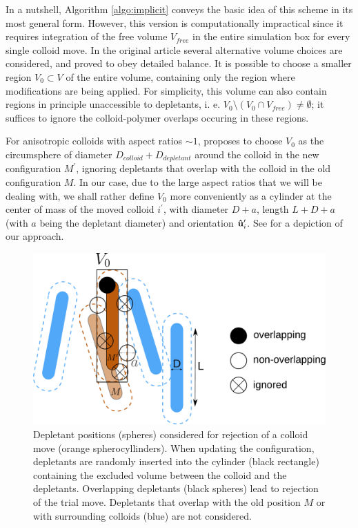 In a nutshell, Algorithm \ref{algo:implicit} conveys the basic idea of this scheme in its most general form. However, this version is computationally impractical since it requires integration of the free volume $V_{free}$ in the entire simulation box for every single colloid move. In the original article \cite{glaser2015parallel} several alternative volume choices are considered, and proved to obey detailed balance. It is possible to choose a smaller region $V_0 \subset V$ of the entire volume, containing only the region where modifications are being applied. For simplicity, this volume can also contain regions in principle unaccessible to depletants, i. e. $V_0 \setminus (V_0 \cap V_{free}) \neq \emptyset$; it suffices to ignore the colloid-polymer overlaps occuring in these regions.

For anisotropic colloids with aspect ratios $\sim 1$, \cite{glaser2015parallel} proposes to choose $V_0$ as the circumsphere of diameter $D_{colloid} + D_{depletant}$ around the colloid in the new configuration $M^\prime$, ignoring depletants that overlap with the colloid in the old configuration $M$. In our case, due to the large aspect ratios that we will be dealing with, we shall rather define $V_0$ more conveniently as a cylinder at the center of mass of the moved colloid $i^\prime$, with diameter $D + a$, length $L + D + a$ (with $a$ being the depletant diameter) and orientation ${\bf \hat{u}}_i^\prime$. See  for a depiction of our approach.

\begin{figure}
\begin{center}
\includegraphics[width= .8\columnwidth]{figures/chapter-1/implicit_depletants}
\caption[Depletant positions (spheres) considered for rejection of a colloid move (orange spherocyllinders)]{ \label{implicit} Depletant positions (spheres) considered for rejection of a colloid move (orange spherocyllinders). When updating the configuration, depletants are randomly inserted into the cylinder (black rectangle) containing the excluded volume between the colloid and the depletants. Overlapping depletants (black spheres) lead to rejection of the trial move. Depletants that overlap with the old position $M$ or with surrounding colloids (blue) are not considered.}
\end{center}
\end{figure}

\clearpage